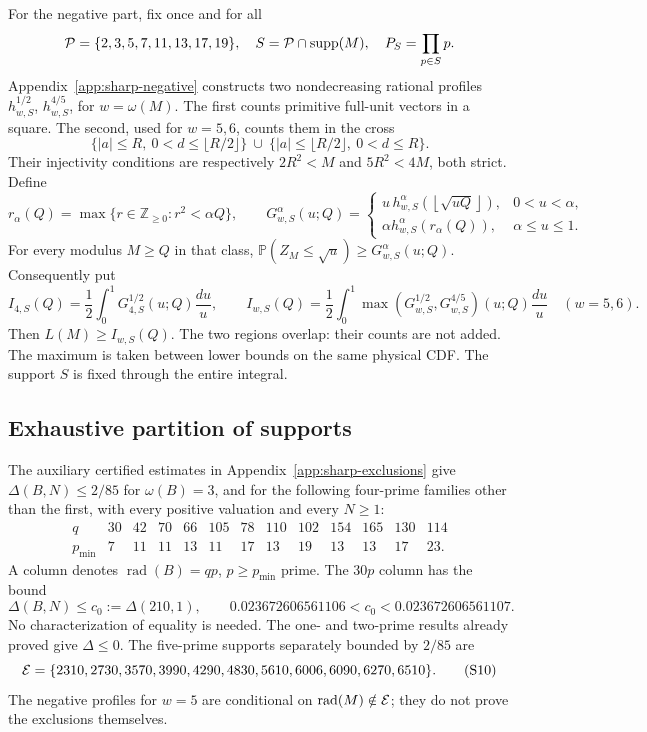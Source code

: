\documentclass[11pt]{article}
\theoremstyle{definition}\newtheorem{definition}[theorem]{Definition}
\theoremstyle{remark}\newtheorem{remark}[theorem]{Remark}
\newcommand{\Prb}{\mathbb P}
\newcommand{\Z}{\mathbb Z}
\newcommand{\rad}{\operatorname{rad}}
\newcommand{\floor}[1]{\left\lfloor #1\right\rfloor}
\begin{document}
For the negative part, fix once and for all
\[
 {\cal P}=\{2,3,5,7,11,13,17,19\},\quad
 S={\cal P}\cap\operatorname{supp}(M),\quad P_S=\prod_{p\in S}p.
\]
Appendix~\ref{app:sharp-negative} constructs two nondecreasing rational
profiles \(h^{1/2}_{w,S}\), \(h^{4/5}_{w,S}\), for \(w=\omega(M)\).
The first counts primitive full-unit vectors in a square. The second,
used for \(w=5,6\), counts them in the cross
\[
 \{|a|\le R,\ 0<d\le\lfloor R/2\rfloor\}
 \ \cup\
 \{|a|\le\lfloor R/2\rfloor,\ 0<d\le R\}.
\]
Their injectivity conditions are respectively \(2R^2<M\) and
\(5R^2<4M\), both strict. Define
\[
 r_\alpha(Q)=\max\{r\in\Z_{\ge0}:r^2<\alpha Q\},\qquad
 G^\alpha_{w,S}(u;Q)=
 \begin{cases}
 u\,h^\alpha_{w,S}(\floor{\sqrt{uQ}}),&0<u<\alpha,\\
 \alpha h^\alpha_{w,S}(r_\alpha(Q)),&\alpha\le u\le1.
 \end{cases}                                                        \tag{S6}\label{eq:sharp-negative-cdf}
\]
For every modulus \(M\ge Q\) in that class,
\(\Prb(Z_M\le\sqrt u)\ge G^\alpha_{w,S}(u;Q)\).
Consequently put
\[
 I_{4,S}(Q)=\frac12\int_0^1G^{1/2}_{4,S}(u;Q)\frac{du}{u},\qquad
 I_{w,S}(Q)=\frac12\int_0^1
 \max(G^{1/2}_{w,S},G^{4/5}_{w,S})(u;Q)\frac{du}{u}\quad(w=5,6).
                                                                    \tag{S7}\label{eq:sharp-negative-integral}
\]
Then \(L(M)\ge I_{w,S}(Q)\).
The two regions overlap: their counts are not added. The maximum is
taken between lower bounds on the same physical CDF. The support \(S\)
is fixed through the entire integral.

\subsection{Exhaustive partition of supports}
The auxiliary certified estimates in Appendix~\ref{app:sharp-exclusions}
give \(\Delta(B,N)\le2/85\) for \(\omega(B)=3\), and for the following
four-prime families other than the first, with every positive valuation
and every \(N\ge1\):
\[
\begin{array}{c|rrrrrrrrrrrr}
 q&30&42&70&66&105&78&110&102&154&165&130&114\\
 p_{\min}&7&11&11&13&11&17&13&19&13&13&17&23 .
\end{array}                                                        \tag{S8}\label{eq:sharp-families}
\]
A column denotes \(\rad(B)=qp\), \(p\ge p_{\min}\) prime.
The \(30p\) column has the bound
\[
 \Delta(B,N)\le c_0:=\Delta(210,1),\qquad
 0.023672606561106<c_0<0.023672606561107.                               \tag{S9}\label{eq:sharp-candidate}
\]
No characterization of equality is needed.
The one- and two-prime results already proved give \(\Delta\le0\).
The five-prime supports separately bounded by \(2/85\) are
\[
 {\cal E}=\{2310,2730,3570,3990,4290,4830,5610,6006,6090,6270,6510\}.
                                                                    \tag{S10}\label{eq:sharp-excluded}
\]
The negative profiles for \(w=5\) are conditional on
\(\rad(M)\notin{\cal E}\); they do not prove the exclusions themselves.
\end{document}
